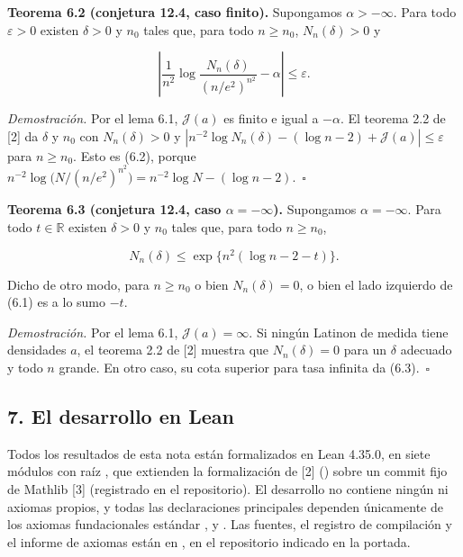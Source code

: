 \documentclass[spanish,11pt,a4paper]{article}
\begin{document}
\textbf{Teorema 6.2 (conjetura 12.4, caso finito).} Supongamos \(\alpha>-\infty\). Para todo \(\varepsilon>0\) existen \(\delta>0\) y \(n_0\) tales que, para todo \(n\ge n_0\), \(N_n(\delta)>0\) y

\nopagebreak[4]
\[\left|\frac1{n^2}\log\frac{N_n(\delta)}{(n/e^2)^{n^2}}-\alpha\right|\le\varepsilon.\tag{6.2}\]

\emph{Demostración.} Por el lema 6.1, \(\mathcal J(a)\) es finito e igual a \(-\alpha\). El teorema 2.2 de {[}2{]} da \(\delta\) y \(n_0\) con \(N_n(\delta)>0\) y \(|n^{-2}\log N_n(\delta)-(\log n-2)+\mathcal J(a)|\le\varepsilon\) para \(n\ge n_0\). Esto es (6.2), porque \(n^{-2}\log\bigl(N/(n/e^2)^{n^2}\bigr)=n^{-2}\log N-(\log n-2)\).~\(\square\)

\textbf{Teorema 6.3 (conjetura 12.4, caso \(\alpha=-\infty\)).} Supongamos \(\alpha=-\infty\). Para todo \(t\in\mathbb R\) existen \(\delta>0\) y \(n_0\) tales que, para todo \(n\ge n_0\),

\nopagebreak[4]
\[N_n(\delta)\le\exp\bigl\{n^2(\log n-2-t)\bigr\}.\tag{6.3}\]

Dicho de otro modo, para \(n\ge n_0\) o bien \(N_n(\delta)=0\), o bien el lado izquierdo de (6.1) es a lo sumo \(-t\).

\emph{Demostración.} Por el lema 6.1, \(\mathcal J(a)=\infty\). Si ningún Latinon de medida tiene densidades \(a\), el teorema 2.2 de {[}2{]} muestra que \(N_n(\delta)=0\) para un \(\delta\) adecuado y todo \(n\) grande. En otro caso, su cota superior para tasa infinita da (6.3).~\(\square\)

\subsection{7. El desarrollo en Lean}\label{el-desarrollo-en-lean}

Todos los resultados de esta nota están formalizados en Lean 4.35.0, en siete módulos con raíz \mbox{}, que extienden la formalización de {[}2{]} (\mbox{}) sobre un commit fijo de Mathlib {[}3{]} (registrado en el repositorio). El desarrollo no contiene ningún \mbox{} ni axiomas propios, y todas las declaraciones principales dependen únicamente de los axiomas fundacionales estándar \mbox{}, \mbox{} y \mbox{}. Las fuentes, el registro de compilación y el informe de axiomas están en , en el repositorio indicado en la portada.
\end{document}
